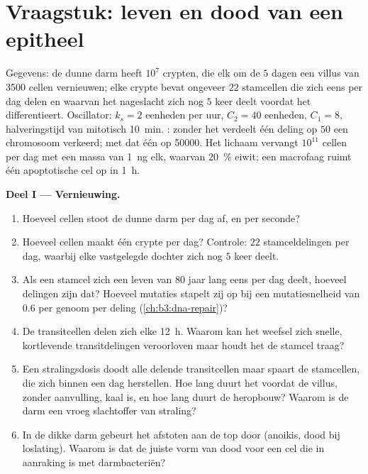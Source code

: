 \section{Vraagstuk: leven en dood van een epitheel}

\begin{problem}
\label{pb:b3:cell-cycle-apoptosis:1}
Gegevens: de dunne darm heeft $10^{7}$ crypten, die elk om de $5$ dagen
een villus van \num{3500} cellen vernieuwen; elke crypte bevat ongeveer
$22$ stamcellen die zich eens per dag delen en waarvan het nageslacht
zich nog $5$ keer deelt voordat het differentieert. Oscillator:
$k_{s} = 2$ eenheden  per uur, $C_{2} = 40$ eenheden,
$C_{1} = 8$, halveringstijd van mitotisch  \qty{10}{min}.
: zonder het  verdeelt één
deling op $50$ een chromosoom verkeerd; met dat  één op
\num{50000}. Het lichaam vervangt $10^{11}$ cellen per dag met een
massa van \qty{1}{ng} elk, waarvan \qty{20}{\%} eiwit; een macrofaag
ruimt één apoptotische cel op in \qty{1}{h}.

\medskip
\noindent\textbf{Deel I --- Vernieuwing.}
\begin{enumerate}
  \item Hoeveel cellen stoot de dunne darm per dag af, en per seconde?
  \item Hoeveel cellen maakt één crypte per dag? Controle: $22$
        stamceldelingen per dag, waarbij elke vastgelegde dochter zich
        nog $5$ keer deelt.
  \item Als een stamcel zich een leven van $80$ jaar lang eens per dag
        deelt, hoeveel delingen zijn dat? Hoeveel mutaties stapelt zij
        op bij een mutatiesnelheid van $0.6$ per genoom per deling
        (\cref{ch:b3:dna-repair})?
  \item De transitcellen delen zich elke \qty{12}{h}. Waarom kan het
        weefsel zich snelle, kortlevende transitdelingen veroorloven
        maar houdt het de stamcel traag?
  \item Een stralingsdosis doodt alle delende transitcellen maar spaart
        de stamcellen, die zich binnen een dag herstellen. Hoe lang
        duurt het voordat de villus, zonder aanvulling, kaal is, en hoe
        lang duurt de heropbouw? Waarom is de darm een vroeg
        slachtoffer van straling?
  \item In de dikke darm gebeurt het afstoten aan de top door 
        (anoikis, dood bij loslating). Waarom is dat de juiste vorm van
        dood voor een cel die in aanraking is met darmbacteriën?
\end{enumerate}


\end{problem}
